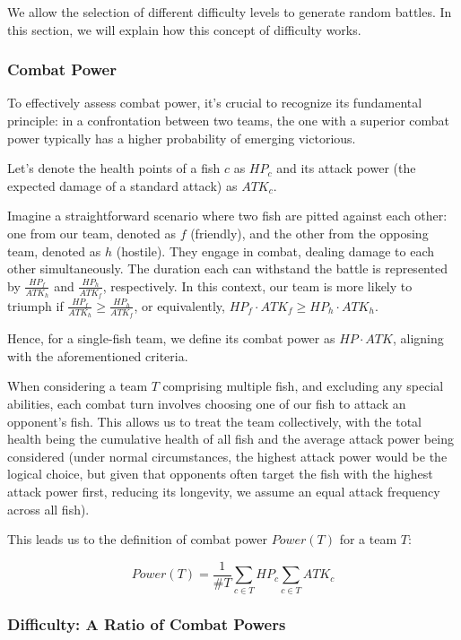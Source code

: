 We allow the selection of different difficulty levels to generate random battles. In this section, we will explain how this concept of difficulty works.

\subsubsection{Combat Power}

To effectively assess combat power, it's crucial to recognize its fundamental principle: in a confrontation between two teams, the one with a superior combat power typically has a higher probability of emerging victorious.

Let's denote the health points of a fish \( c \) as \( HP_{c} \) and its attack power (the expected damage of a standard attack) as \( ATK_{c} \).

Imagine a straightforward scenario where two fish are pitted against each other: one from our team, denoted as \( f \) (friendly), and the other from the opposing team, denoted as \( h \) (hostile). They engage in combat, dealing damage to each other simultaneously. The duration each can withstand the battle is represented by \( \frac{HP_{f}}{ATK_{h}} \) and \( \frac{HP_{h}}{ATK_{f}} \), respectively. In this context, our team is more likely to triumph if \( \frac{HP_{f}}{ATK_{h}} \ge \frac{HP_{h}}{ATK_{f}} \), or equivalently, \( HP_{f} \cdot ATK_{f} \ge HP_{h} \cdot ATK_{h} \).

Hence, for a single-fish team, we define its combat power as \( HP \cdot ATK \), aligning with the aforementioned criteria.

When considering a team \( T \) comprising multiple fish, and excluding any special abilities, each combat turn involves choosing one of our fish to attack an opponent's fish. This allows us to treat the team collectively, with the total health being the cumulative health of all fish and the average attack power being considered (under normal circumstances, the highest attack power would be the logical choice, but given that opponents often target the fish with the highest attack power first, reducing its longevity, we assume an equal attack frequency across all fish).

This leads us to the definition of combat power \( Power(T) \) for a team \( T \):

\[ Power(T) = \frac{1}{\#T} \sum_{c\in T}HP_c \sum_{c\in T}ATK_c \]

\subsubsection{Difficulty: A Ratio of Combat Powers}

